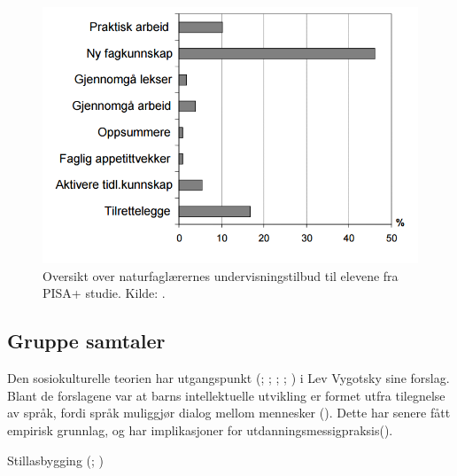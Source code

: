 \documentclass[main.tex]{subfiles}
\begin{document}
\begin{figure}[h!]
\includegraphics[scale = 0.6]{../figures/undervisnings_aktivitet.png}
\caption{Oversikt over naturfaglærernes undervisningstilbud til elevene fra PISA+ studie. Kilde: 
\protect{}.}
\label{fig:odeg10}
\end{figure}

\subsection*{Gruppe samtaler}
Den sosiokulturelle teorien har utgangspunkt (; ; 
; ; ) i Lev Vygotsky sine forslag.
Blant de forslagene var at barns intellektuelle utvikling er formet utfra tilegnelse av språk, fordi
språk muliggjør dialog mellom mennesker (). Dette har senere fått empirisk
grunnlag, og har implikasjoner for utdanningsmessigpraksis().

Stillasbygging (; )
\end{document}
